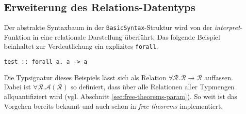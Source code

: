 %
%
%


\subsection{Erweiterung des Relations-Datentyps}

Der abstrakte Syntaxbaum in der \texttt{BasicSyntax}-Struktur wird von der \textit{interpret}-Funktion in eine relationale
Darstellung überführt. Das folgende Beispiel beinhaltet zur Verdeutlichung ein explizites \texttt{forall}.

\begin{verbatim}
test :: forall a. a -> a
\end{verbatim}

Die Typsignatur dieses Beispiels lässt sich als Relation $\forall \mathcal{R}. \mathcal{R} \rightarrow \mathcal{R}$ auffassen.
Dabei ist $\forall \mathcal{R}. \mathcal{A}(\mathcal{R})$ so definiert, dass über alle Relationen aller Typmengen allquantifiziert
wird (vgl. Abschnitt \ref{sec:free-theorems-param}).  So weit ist das Vorgehen bereits bekannt und auch schon
in \textit{free-theorems} implementiert.

